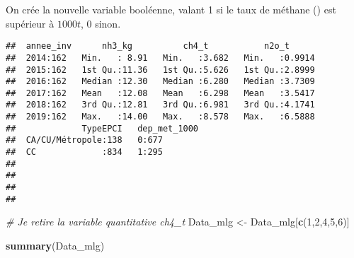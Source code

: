 \documentclass[
]{article}
\newenvironment{Shaded}{\begin{snugshade}}{\end{snugshade}}
\newcommand{\CommentTok}[1]{\textcolor[rgb]{0.56,0.35,0.01}{\textit{#1}}}
\newcommand{\DecValTok}[1]{\textcolor[rgb]{0.00,0.00,0.81}{#1}}
\newcommand{\FunctionTok}[1]{\textcolor[rgb]{0.13,0.29,0.53}{\textbf{#1}}}
\newcommand{\NormalTok}[1]{#1}
\newcommand{\OtherTok}[1]{\textcolor[rgb]{0.56,0.35,0.01}{#1}}
\newcommand{\SpecialCharTok}[1]{\textcolor[rgb]{0.81,0.36,0.00}{\textbf{#1}}}
\begin{document}
On crée la nouvelle variable booléenne, valant 1 si le taux de méthane
() est supérieur à \(1000t\), 0 sinon.

\begin{Shaded}
\end{Shaded}

\begin{verbatim}
##  annee_inv      nh3_kg          ch4_t           n2o_t       
##  2014:162   Min.   : 8.91   Min.   :3.682   Min.   :0.9914  
##  2015:162   1st Qu.:11.36   1st Qu.:5.626   1st Qu.:2.8999  
##  2016:162   Median :12.30   Median :6.280   Median :3.7309  
##  2017:162   Mean   :12.08   Mean   :6.298   Mean   :3.5417  
##  2018:162   3rd Qu.:12.81   3rd Qu.:6.981   3rd Qu.:4.1741  
##  2019:162   Max.   :14.00   Max.   :8.578   Max.   :6.5888  
##             TypeEPCI   dep_met_1000
##  CA/CU/Métropole:138   0:677       
##  CC             :834   1:295       
##                                    
##                                    
##                                    
## 
\end{verbatim}

\begin{Shaded}
\begin{Highlighting}[]
\CommentTok{\# Je retire la variable quantitative ch4\_t}
\NormalTok{Data\_mlg }\OtherTok{\textless{}{-}}\NormalTok{ Data\_mlg[}\FunctionTok{c}\NormalTok{(}\DecValTok{1}\NormalTok{,}\DecValTok{2}\NormalTok{,}\DecValTok{4}\NormalTok{,}\DecValTok{5}\NormalTok{,}\DecValTok{6}\NormalTok{)]}

\FunctionTok{summary}\NormalTok{(Data\_mlg)}
\end{Highlighting}
\end{Shaded}
\end{document}
